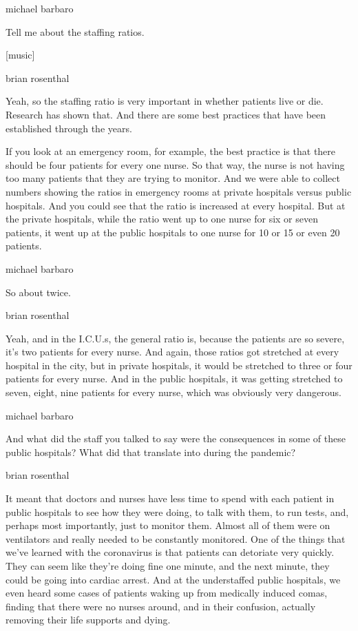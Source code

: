 michael barbaro

Tell me about the staffing ratios.

{[}music{]}

brian rosenthal

Yeah, so the staffing ratio is very important in whether patients live
or die. Research has shown that. And there are some best practices that
have been established through the years.

If you look at an emergency room, for example, the best practice is that
there should be four patients for every one nurse. So that way, the
nurse is not having too many patients that they are trying to monitor.
And we were able to collect numbers showing the ratios in emergency
rooms at private hospitals versus public hospitals. And you could see
that the ratio is increased at every hospital. But at the private
hospitals, while the ratio went up to one nurse for six or seven
patients, it went up at the public hospitals to one nurse for 10 or 15
or even 20 patients.

michael barbaro

So about twice.

brian rosenthal

Yeah, and in the I.C.U.s, the general ratio is, because the patients are
so severe, it's two patients for every nurse. And again, those ratios
got stretched at every hospital in the city, but in private hospitals,
it would be stretched to three or four patients for every nurse. And in
the public hospitals, it was getting stretched to seven, eight, nine
patients for every nurse, which was obviously very dangerous.

michael barbaro

And what did the staff you talked to say were the consequences in some
of these public hospitals? What did that translate into during the
pandemic?

brian rosenthal

It meant that doctors and nurses have less time to spend with each
patient in public hospitals to see how they were doing, to talk with
them, to run tests, and, perhaps most importantly, just to monitor them.
Almost all of them were on ventilators and really needed to be
constantly monitored. One of the things that we've learned with the
coronavirus is that patients can detoriate very quickly. They can seem
like they're doing fine one minute, and the next minute, they could be
going into cardiac arrest. And at the understaffed public hospitals, we
even heard some cases of patients waking up from medically induced
comas, finding that there were no nurses around, and in their confusion,
actually removing their life supports and dying.

